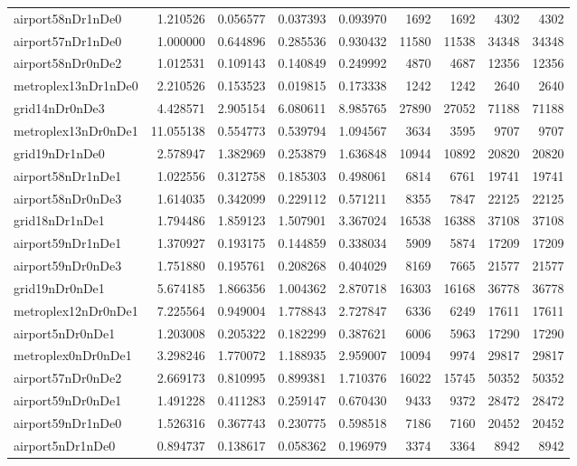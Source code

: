 \begin{longtable}{|l|r|r|r|r|r|r|r|r|}
airport58nDr1nDe0 & 1.210526 & 0.056577 & 0.037393 & 0.093970 & 1692 & 1692 & 4302 & 4302 \\
airport57nDr1nDe0 & 1.000000 & 0.644896 & 0.285536 & 0.930432 & 11580 & 11538 & 34348 & 34348 \\
airport58nDr0nDe2 & 1.012531 & 0.109143 & 0.140849 & 0.249992 & 4870 & 4687 & 12356 & 12356 \\
metroplex13nDr1nDe0 & 2.210526 & 0.153523 & 0.019815 & 0.173338 & 1242 & 1242 & 2640 & 2640 \\
grid14nDr0nDe3 & 4.428571 & 2.905154 & 6.080611 & 8.985765 & 27890 & 27052 & 71188 & 71188 \\
metroplex13nDr0nDe1 & 11.055138 & 0.554773 & 0.539794 & 1.094567 & 3634 & 3595 & 9707 & 9707 \\
grid19nDr1nDe0 & 2.578947 & 1.382969 & 0.253879 & 1.636848 & 10944 & 10892 & 20820 & 20820 \\
airport58nDr1nDe1 & 1.022556 & 0.312758 & 0.185303 & 0.498061 & 6814 & 6761 & 19741 & 19741 \\
airport58nDr0nDe3 & 1.614035 & 0.342099 & 0.229112 & 0.571211 & 8355 & 7847 & 22125 & 22125 \\
grid18nDr1nDe1 & 1.794486 & 1.859123 & 1.507901 & 3.367024 & 16538 & 16388 & 37108 & 37108 \\
airport59nDr1nDe1 & 1.370927 & 0.193175 & 0.144859 & 0.338034 & 5909 & 5874 & 17209 & 17209 \\
airport59nDr0nDe3 & 1.751880 & 0.195761 & 0.208268 & 0.404029 & 8169 & 7665 & 21577 & 21577 \\
grid19nDr0nDe1 & 5.674185 & 1.866356 & 1.004362 & 2.870718 & 16303 & 16168 & 36778 & 36778 \\
metroplex12nDr0nDe1 & 7.225564 & 0.949004 & 1.778843 & 2.727847 & 6336 & 6249 & 17611 & 17611 \\
airport5nDr0nDe1 & 1.203008 & 0.205322 & 0.182299 & 0.387621 & 6006 & 5963 & 17290 & 17290 \\
metroplex0nDr0nDe1 & 3.298246 & 1.770072 & 1.188935 & 2.959007 & 10094 & 9974 & 29817 & 29817 \\
airport57nDr0nDe2 & 2.669173 & 0.810995 & 0.899381 & 1.710376 & 16022 & 15745 & 50352 & 50352 \\
airport59nDr0nDe1 & 1.491228 & 0.411283 & 0.259147 & 0.670430 & 9433 & 9372 & 28472 & 28472 \\
airport59nDr1nDe0 & 1.526316 & 0.367743 & 0.230775 & 0.598518 & 7186 & 7160 & 20452 & 20452 \\
airport5nDr1nDe0 & 0.894737 & 0.138617 & 0.058362 & 0.196979 & 3374 & 3364 & 8942 & 8942 \\

\end{longtable}
